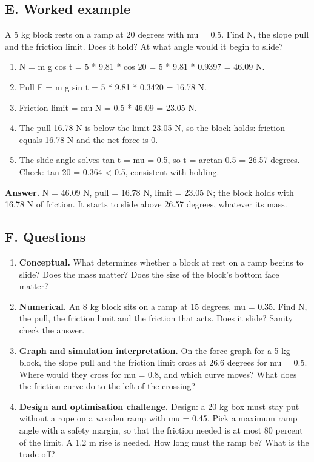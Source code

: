 \documentclass[11pt,a4paper]{article}
\begin{document}
\subsection*{E. Worked example}
A 5 kg block rests on a ramp at 20 degrees with mu = 0.5. Find N, the slope pull and the friction limit. Does it hold? At what angle would it begin to slide?
\begin{enumerate}[nosep]
\item N = m g cos t = 5 * 9.81 * cos 20 = 5 * 9.81 * 0.9397 = 46.09 N.
\item Pull F = m g sin t = 5 * 9.81 * 0.3420 = 16.78 N.
\item Friction limit = mu N = 0.5 * 46.09 = 23.05 N.
\item The pull 16.78 N is below the limit 23.05 N, so the block holds: friction equals 16.78 N and the net force is 0.
\item The slide angle solves tan t = mu = 0.5, so t = arctan 0.5 = 26.57 degrees. Check: tan 20 = 0.364 \textless{} 0.5, consistent with holding.
\end{enumerate}
\textbf{Answer.} N = 46.09 N, pull = 16.78 N, limit = 23.05 N; the block holds with 16.78 N of friction. It starts to slide above 26.57 degrees, whatever its mass.

\subsection*{F. Questions}
\begin{enumerate}[nosep]
\item \textbf{Conceptual.} What determines whether a block at rest on a ramp begins to slide? Does the mass matter? Does the size of the block's bottom face matter?
\item \textbf{Numerical.} An 8 kg block sits on a ramp at 15 degrees, mu = 0.35. Find N, the pull, the friction limit and the friction that acts. Does it slide? Sanity check the answer.
\item \textbf{Graph and simulation interpretation.} On the force graph for a 5 kg block, the slope pull and the friction limit cross at 26.6 degrees for mu = 0.5. Where would they cross for mu = 0.8, and which curve moves? What does the friction curve do to the left of the crossing?
\item \textbf{Design and optimisation challenge.} Design: a 20 kg box must stay put without a rope on a wooden ramp with mu = 0.45. Pick a maximum ramp angle with a safety margin, so that the friction needed is at most 80 percent of the limit. A 1.2 m rise is needed. How long must the ramp be? What is the trade-off?
\end{enumerate}
\end{document}
